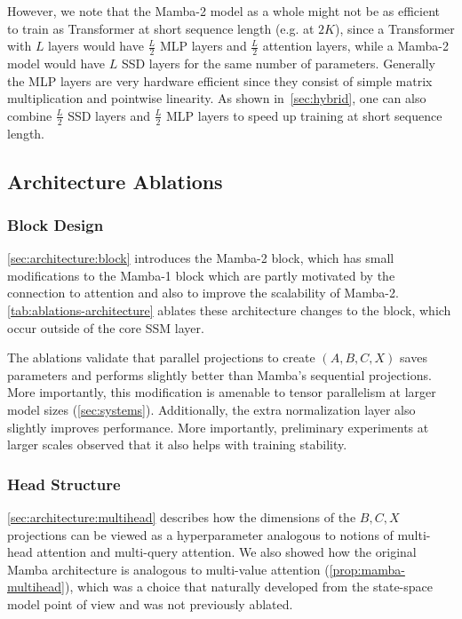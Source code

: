 However, we note that the Mamba-2 model as a whole might not be as efficient to train as Transformer at short sequence length (e.g. at $2K$), since a Transformer with $L$ layers would have $\frac{L}{2}$ MLP layers and $\frac{L}{2}$ attention layers, while a Mamba-2 model would have $L$ SSD layers for the same number of parameters. Generally the MLP layers are very hardware efficient since they consist of simple matrix multiplication and pointwise linearity. As shown in~\ref{sec:hybrid}, one can also combine $\frac{L}{2}$ SSD layers and $\frac{L}{2}$ MLP layers to speed up training at short sequence length.

\subsection{Architecture Ablations}
\label{sec:experiments:ablations}

\subsubsection{Block Design}
\label{sec:experiments:ablations:block}

\ref{sec:architecture:block} introduces the Mamba-2 block, which has small modifications to the Mamba-1 block which are partly motivated by the connection to attention and also to improve the scalability of Mamba-2.
\ref{tab:ablations-architecture} ablates these architecture changes to the block, which occur outside of the core SSM layer.

The ablations validate that parallel projections to create $(A,B,C,X)$ saves parameters and performs slightly better than Mamba's sequential projections. More importantly, this modification is amenable to tensor parallelism at larger model sizes (\ref{sec:systems}).
Additionally, the extra normalization layer also slightly improves performance. More importantly, preliminary experiments at larger scales observed that it also helps with training stability.

\subsubsection{Head Structure}

\ref{sec:architecture:multihead} describes how the dimensions of the $B, C, X$ projections can be viewed as a hyperparameter analogous to notions of multi-head attention and multi-query attention. We also showed how the original Mamba architecture is analogous to multi-value attention (\ref{prop:mamba-multihead}),
which was a choice that naturally developed from the state-space model point of view and was not previously ablated.

